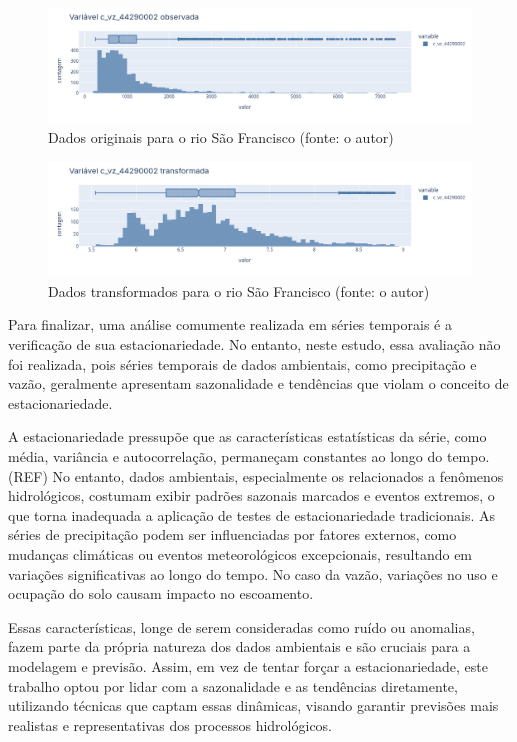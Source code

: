 \begin{figure}[!h]
\centering
\includegraphics[scale=0.33]{Figuras/rio_sao_francisco_antes_log.png}
\caption{Dados originais para o rio São Francisco (fonte: o autor)}
\label{fig:rio_sao_francisco_antes_log}
\end{figure}

\begin{figure}[!h]
\centering
\includegraphics[scale=0.33]{Figuras/rio_sao_francisco_depois_log.png}
\caption{Dados transformados para o rio São Francisco (fonte: o autor)}
\label{fig:rio_sao_francisco_depois_log}
\end{figure}
\clearpage

Para finalizar, uma análise comumente realizada em séries temporais é a verificação de sua estacionariedade. No entanto, neste estudo, essa avaliação não foi realizada, pois séries temporais de dados ambientais, como precipitação e vazão, geralmente apresentam sazonalidade e tendências que violam o conceito de estacionariedade.

A estacionariedade pressupõe que as características estatísticas da série, como média, variância e autocorrelação, permaneçam constantes ao longo do tempo. (REF) No entanto, dados ambientais, especialmente os relacionados a fenômenos hidrológicos, costumam exibir padrões sazonais marcados e eventos extremos, o que torna inadequada a aplicação de testes de estacionariedade tradicionais. As séries de precipitação podem ser influenciadas por fatores externos, como mudanças climáticas ou eventos meteorológicos excepcionais, resultando em variações significativas ao longo do tempo. No caso da vazão, variações no uso e ocupação do solo causam impacto no escoamento.

Essas características, longe de serem consideradas como ruído ou anomalias, fazem parte da própria natureza dos dados ambientais e são cruciais para a modelagem e previsão. Assim, em vez de tentar forçar a estacionariedade, este trabalho optou por lidar com a sazonalidade e as tendências diretamente, utilizando técnicas que captam essas dinâmicas, visando garantir previsões mais realistas e representativas dos processos hidrológicos.


